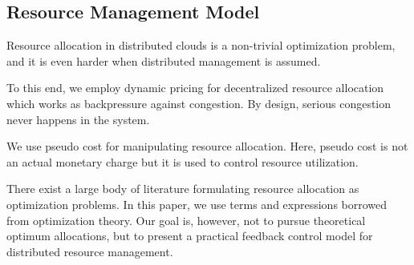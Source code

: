 \subsection{Resource Management Model}

Resource allocation in distributed clouds is a non-trivial
optimization problem, and it is even harder when distributed
management is assumed.

To this end, we employ dynamic pricing for decentralized resource
allocation which works as backpressure against congestion.
By design, serious congestion never happens in the system.

We use pseudo cost for manipulating resource allocation.
Here, pseudo cost is not an actual monetary charge but it is used to
control resource utilization.

There exist a large body of literature formulating resource allocation
as optimization problems.
In this paper, we use terms and expressions borrowed from optimization
theory. Our goal is, however, not to pursue theoretical optimum
allocations, but to present a practical feedback control model for
distributed resource management.


